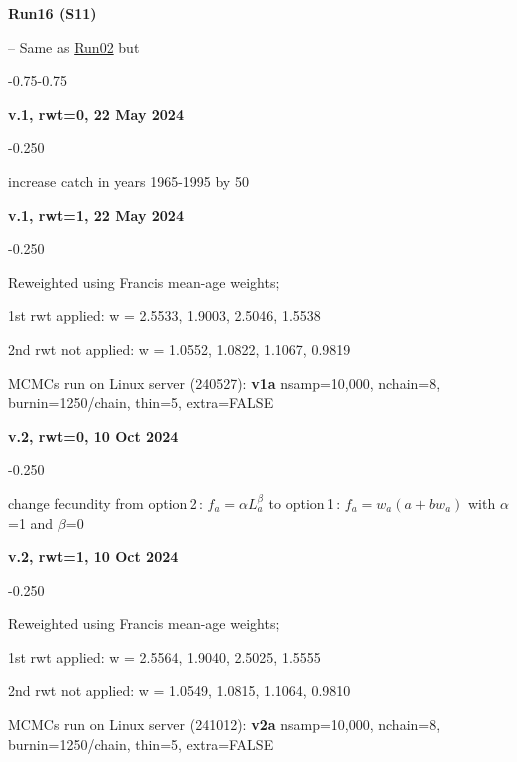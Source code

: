\hypertarget{R16}{\textbf{Run16 (S11)}} -- Same as \hyperlink{R02}{Run02} but
\begin{itemize_csas}{-0.75}{-0.75}
	\item \textbf{v.1, rwt=0, 22 May 2024}
	\begin{itemize_csas}{-0.25}{0}
		\item increase catch in years 1965-1995 by 50\pc{}
	\end{itemize_csas}
	\item \textbf{v.1, rwt=1, 22 May 2024}
	\begin{itemize_csas}{-0.25}{0}
		\item Reweighted using Francis mean-age weights;
		\item 1st rwt applied: w = 2.5533, 1.9003, 2.5046, 1.5538
		\item 2nd rwt not applied: w = 1.0552, 1.0822, 1.1067, 0.9819
		\item MCMCs run on Linux server (240527): \textbf{v1a} nsamp=10,000, nchain=8, burnin=1250/chain, thin=5, extra=FALSE
	\end{itemize_csas}
	\item \textbf{v.2, rwt=0, 10 Oct 2024}
	\begin{itemize_csas}{-0.25}{0}
		\item change fecundity from option\,2\,: $f_a = \alpha L_a^{\beta}$ to option\,1\,:  $f_a = w_a (a + b w_a)$ with $\alpha$=1 and $\beta$=0
	\end{itemize_csas}
	\item \textbf{v.2, rwt=1, 10 Oct 2024}
	\begin{itemize_csas}{-0.25}{0}
		\item Reweighted using Francis mean-age weights;
		\item 1st rwt applied: w = 2.5564, 1.9040, 2.5025, 1.5555
		\item 2nd rwt not applied: w = 1.0549, 1.0815, 1.1064, 0.9810
		\item MCMCs run on Linux server (241012): \textbf{v2a} nsamp=10,000, nchain=8, burnin=1250/chain, thin=5, extra=FALSE
	\end{itemize_csas}
\end{itemize_csas}

